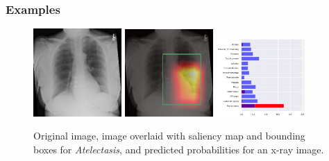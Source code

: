 \documentclass[8pt]{beamer}
\begin{document}
\begin{frame}
\frametitle{Examples}
  \begin{figure}[H]
  \centering
  \includegraphics[width=0.3\textwidth]{images/preds/atelectasis}\hspace{0.01\textwidth}%
  \includegraphics[width=0.3\textwidth]{images/preds/atelectasis_cam}\hspace{0.01\textwidth}%
  \includegraphics[width=0.3\textwidth]{images/preds/atelectasis_probs}\\[0.01\textwidth]
  \caption{Original image, image overlaid with saliency map and bounding boxes
    for \emph{Atelectasis}, and predicted probabilities for an x-ray image.}
  \label{examples_1}
\end{figure}\end{frame}
\end{document}
